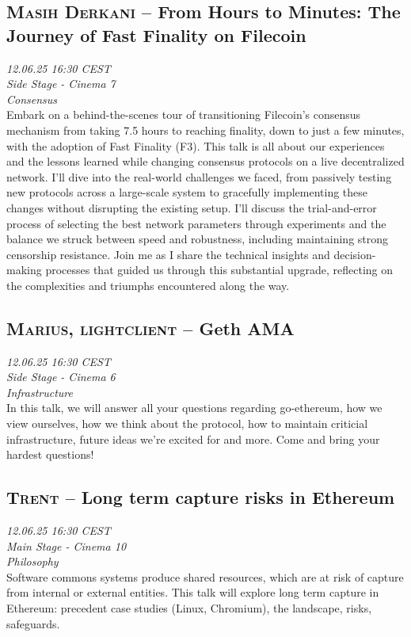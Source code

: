 \clearpage
\subsection {\textsc{Masih Derkani}  -- From Hours to Minutes: The Journey of Fast Finality on Filecoin} \noindent \textit {12.06.25 16:30 CEST\\ Side Stage - Cinema 7\\ Consensus}\\[1em] Embark on a behind-the-scenes tour of transitioning Filecoin’s consensus mechanism from taking 7.5 hours to reaching finality, down to just a few minutes, with the adoption of Fast Finality (F3). This talk is all about our experiences and the lessons learned while changing consensus protocols on a live decentralized network. I’ll dive into the real-world challenges we faced, from passively testing new protocols across a large-scale system to gracefully implementing these changes without disrupting the existing setup. I’ll discuss the trial-and-error process of selecting the best network parameters through experiments and the balance we struck between speed and robustness, including maintaining strong censorship resistance. Join me as I share the technical insights and decision-making processes that guided us through this substantial upgrade, reflecting on the complexities and triumphs encountered along the way.

\clearpage
\subsection {\textsc{Marius, lightclient}  -- Geth AMA} \noindent \textit {12.06.25 16:30 CEST\\ Side Stage - Cinema 6\\ Infrastructure}\\[1em] In this talk, we will answer all your questions regarding go-ethereum, how we view ourselves, how we think about the protocol, how to maintain criticial infrastructure, future ideas we're excited for and more. Come and bring your hardest questions!

\clearpage
\subsection {\textsc{Trent}  -- Long term capture risks in Ethereum} \noindent \textit {12.06.25 16:30 CEST\\ Main Stage - Cinema 10\\ Philosophy}\\[1em] Software commons systems produce shared resources, which are at risk of capture from internal or external entities. This talk will explore long term capture in Ethereum: precedent case studies (Linux, Chromium), the landscape, risks, safeguards.

